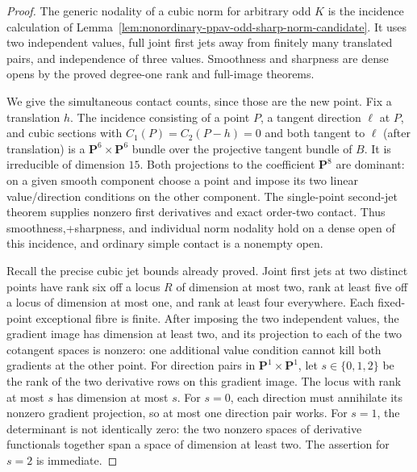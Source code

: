 \begin{proof}
The generic nodality of a cubic norm for arbitrary odd $K$ is the
incidence calculation of
Lemma~\ref{lem:nonordinary-ppav-odd-sharp-norm-candidate}.
It uses two independent values, full joint first jets away from
finitely many translated pairs, and independence of three values.
Smoothness and sharpness are dense opens by the proved degree-one
rank and full-image theorems.

We give the simultaneous contact counts, since those are the new
point. Fix a translation $h$. The incidence consisting of a point
$P$, a tangent direction $\ell$ at $P$, and cubic sections with
$C_1(P)=C_2(P-h)=0$ and both tangent to $\ell$ (after translation)
is a $\mathbf P^6\times\mathbf P^6$ bundle over the projective
tangent bundle of $B$. It is irreducible of dimension $15$.
Both projections to the coefficient $\mathbf P^8$ are dominant:
on a given smooth component choose a point and impose its two
linear value/direction conditions on the other component.
The single-point second-jet theorem supplies nonzero first
derivatives and exact order-two contact. Thus smoothness,+sharpness, and individual norm nodality hold on a dense open of
this incidence, and ordinary simple contact is a nonempty open.

Recall the precise cubic jet bounds already proved. Joint first
jets at two distinct points have rank six off a locus $R$ of
dimension at most two, rank at least five off a locus of dimension
at most one, and rank at least four everywhere. Each fixed-point
exceptional fibre is finite. After imposing the two independent
values, the gradient image has dimension at least two, and its
projection to each of the two cotangent spaces is nonzero: one
additional value condition cannot kill both gradients at the other
point. For direction pairs in $\mathbf P^1\times\mathbf P^1$,
let $s\in\{0,1,2\}$ be the rank of the two derivative rows on this
gradient image. The locus with rank at most $s$ has dimension at
most $s$. For $s=0$, each direction must annihilate its nonzero
gradient projection, so at most one direction pair works. For
$s=1$, the determinant is not identically zero: the two nonzero
spaces of derivative functionals together span a space of dimension
at least two. The assertion for $s=2$ is immediate.


\end{proof}
